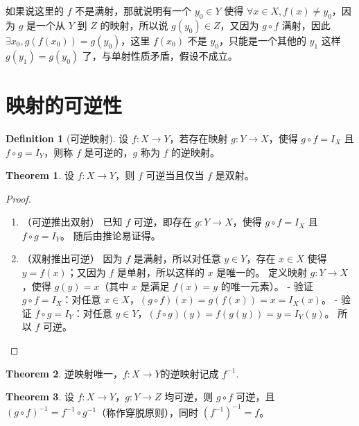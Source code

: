 \documentclass[oneside]{book}
\theoremstyle{definition}
\newtheorem{definition}{Definition}[section]
\newtheorem{theorem}{Theorem}[section]
\begin{document}
	如果说这里的 \(f\) 不是满射，那就说明有一个 \(y_0\in Y\) 使得 \(\forall x\in X,f(x)\neq y_0\)，因为 \(g\) 是一个从 \(Y\) 到 \(Z\) 的映射，所以说 \(g(y_0)\in Z\)，又因为 \(g\circ f\) 满射，因此 \(\exists x_0,g(f(x_0))=g(y_0)\)，这里 \(f(x_0)\) 不是 \(y_0\)，只能是一个其他的 \(y_1\) 这样 \(g(y_1)=g(y_0)\) 了，与单射性质矛盾，假设不成立。
	\section{映射的可逆性}
	
	\begin{definition}[可逆映射]
		设 \( f: X \to Y \)，若存在映射 \( g: Y \to X \)，使得 \( g \circ f = I_X \) 且 \( f \circ g = I_Y \)，则称 \( f \) 是可逆的，\( g \) 称为 \( f \) 的逆映射。
	\end{definition}
	
	\begin{theorem}
		设 \( f: X \to Y \)，则 \( f \) 可逆当且仅当 \( f \) 是双射。
	\end{theorem}
	
	\begin{proof}
		\begin{enumerate}
			\item [\( \Rightarrow \)] （可逆推出双射）
			已知 \( f \) 可逆，即存在 \( g: Y \to X \)，使得 \( g \circ f = I_X \) 且 \( f \circ g = I_Y \)。
		随后由推论易证得。
			\item [\( \Leftarrow \)] （双射推出可逆）
			因为 \( f \) 是满射，所以对任意 \( y \in Y \)，存在 \( x \in X \) 使得 \( y = f(x) \)；又因为 \( f \) 是单射，所以这样的 \( x \) 是唯一的。
			定义映射 \( g: Y \to X \)，使得 \( g(y) = x \)（其中 \( x \) 是满足 \( f(x) = y \) 的唯一元素）。
			- 验证 \( g \circ f = I_X \)：对任意 \( x \in X \)，\( (g \circ f)(x) = g(f(x)) = x = I_X(x) \)。
			- 验证 \( f \circ g = I_Y \)：对任意 \( y \in Y \)，\( (f \circ g)(y) = f(g(y)) = y = I_Y(y) \)。
			所以 \( f \) 可逆。
		\end{enumerate}
	\end{proof}
	
	\begin{theorem}
		逆映射唯一，\( f: X \to Y \)的逆映射记成 \( f^{-1} \).
	\end{theorem}
	\begin{theorem}
		设 \( f: X \to Y \)，\( g: Y \to Z \) 均可逆，则 \( g \circ f \) 可逆，且 \( (g \circ f)^{-1} = f^{-1} \circ g^{-1} \)（称作穿脱原则），同时 \( (f^{-1})^{-1} = f \)。
	\end{theorem}
\end{document}
